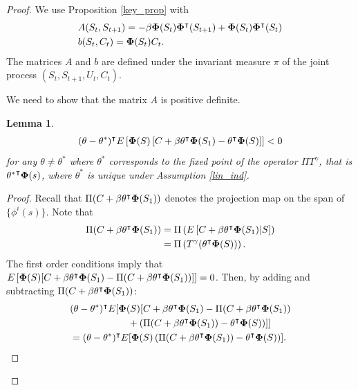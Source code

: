 \documentclass[11pt]{article}
\newtheorem{lemma}{Lemma}
\begin{document}
\begin{proof}
We use Proposition \ref{key_prop} with 
\begin{align*}
&A(S_t,S_{t+1})= -\beta{\bf \Phi}(S_t){\bf \Phi}^\intercal(S_{t+1})+ {\bf \Phi}(S_t){\bf \Phi}^\intercal(S_{t})\\
&b(S_t,C_t)={\bf \Phi}(S_t)C_t.
\end{align*}
The matrices $A$ and $b$ are defined under the invariant measure $\pi$ of the  joint process $(S_t,S_{t+1},U_t,C_t)$. 
 
 We need to show that the matrix $A$ is positive definite. 
 
 \begin{lemma}\label{helpful_lem}
\begin{align*}
(\theta-\theta^*)^\intercal E\left[ {\bf \Phi}(S)\left[ C+\beta \theta^\intercal{\bf \Phi}(S_1) - \theta^\intercal{\bf \Phi}(S)\right] \right]<0
\end{align*}
for any $\theta\neq\theta^*$ where $\theta^*$ corresponds to the fixed point of the operator $\Pi T^\gamma$, that is ${\theta^*}^\intercal{\bf \Phi}(s)$, where $\theta^*$ is unique under Assumption \ref{lin_ind}. 
\end{lemma}
\begin{proof}
Recall that $\Pi(C+\beta \theta^\intercal{\bf \Phi}(S_1) )$ denotes the projection map on the span of $\{\phi^i(s)\}$. Note that
\begin{align*}
\Pi(C+\beta \theta^\intercal{\bf \Phi}(S_1) ) &= \Pi\left(E\left[C+\beta \theta^\intercal{\bf \Phi}(S_1) |S\right]\right)\\
&=\Pi\left( T^\gamma ( \theta^\intercal{\bf \Phi}(S) ) \right).
\end{align*}
The first order conditions imply that $E\left[{\bf \Phi}(S)[ C+\beta \theta^\intercal{\bf \Phi}(S_1)  - \Pi(C+\beta \theta^\intercal{\bf \Phi}(S_1) ) ] \right]=0$. Then,  by adding and subtracting $ \Pi(C+\beta \theta^\intercal{\bf \Phi}(S_1) )$:
\begin{align*}
&(\theta-\theta^*)^\intercal E[ {\bf \Phi}(S)[ C+\beta \theta^\intercal{\bf \Phi}(S_1)  - \Pi(C+\beta \theta^\intercal{\bf \Phi}(S_1) )  \\
&\qquad\qquad\qquad +\left(  \Pi(C+\beta \theta^\intercal{\bf \Phi}(S_1) )-\theta^\intercal{\bf \Phi}(S)\right)] ]\\
& = (\theta-\theta^*)^\intercal E[ {\bf \Phi}(S)\left(  \Pi(C+\beta \theta^\intercal{\bf \Phi}(S_1) )-\theta^\intercal{\bf \Phi}(S) \right)] .
\end{align*}



\end{proof}
\end{proof}
\end{document}
